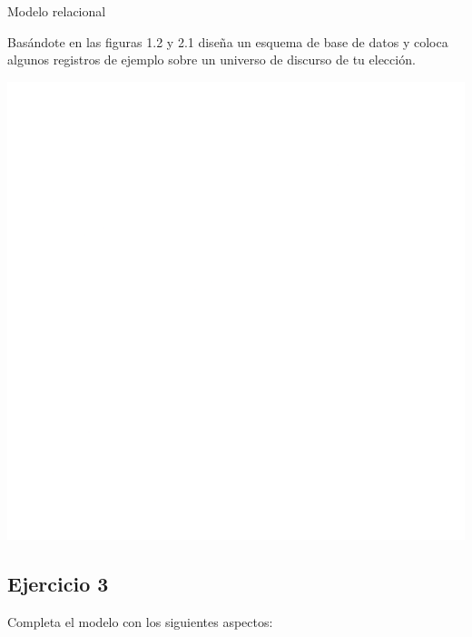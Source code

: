 \documentclass[a4paper,12pt]{article}
\begin{document}
Modelo relacional

\textcolor{sun}{Basándote en las figuras 1.2 y 2.1 diseña un esquema de base de datos y coloca algunos
registros de ejemplo sobre un universo de discurso de tu elección.}

\begin{center}
    \includegraphics[scale = .6]{ejercico02.png}
\end{center}

\subsection*{Ejercicio 3}

Completa el modelo con los siguientes aspectos:
\end{document}
